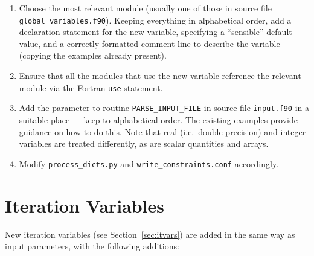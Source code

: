 \documentclass[11pt,a4paper]{report}
\begin{document}
\begin{enumerate}

\item Choose the most relevant module (usually one of those in source file
  \texttt{global\_variables.f90}). Keeping everything in alphabetical order,
  add a declaration statement for the new variable, specifying a ``sensible''
  default value, and a correctly formatted comment line to describe the
  variable (copying the examples already present).

\item Ensure that all the modules that use the new variable reference the
  relevant module via the Fortran \texttt{use} statement.

\item Add the parameter to routine \texttt{PARSE\_INPUT\_FILE} in source file
  \texttt{input.f90} in a suitable place --- keep to alphabetical order. The
  existing examples provide guidance on how to do this. Note that real (i.e.\
  double precision) and integer variables are treated differently, as are
  scalar quantities and arrays.

\item Modify \texttt{process\_dicts.py} and \texttt{write\_constraints.conf}
  accordingly.

\end{enumerate}

\section{Iteration Variables}

New iteration variables (see Section~\ref{sec:itvars}) are added in the
same way as input parameters, with the following additions:
\end{document}
